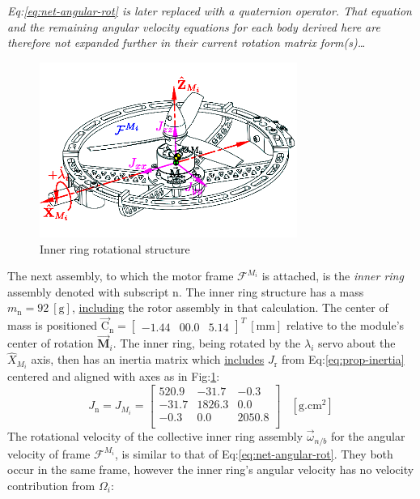\emph{\color{gray} Eq:\ref{eq:net-angular-rot} is later replaced with a quaternion operator. That equation and the remaining angular velocity equations for each body derived here are therefore not expanded further in their current rotation matrix form(s)\ldots}
\par
\begin{figure}[htbp]
\vspace{-12pt}
\centering
\includegraphics[width=0.75\textwidth]{figs/inertia-inner}
\vspace{-10pt}
\caption{Inner ring rotational structure}
\label{fig:inertia-inner}
\end{figure}
The next assembly, to which the motor frame $\mathcal{F}^{M_i}$ is attached, is the \emph{inner ring} assembly denoted with subscript n. The inner ring structure has a mass $m_\text{n}=92~[\text{g}]$, \underline{including} the rotor assembly in that calculation. The center of mass is positioned $\vec{\text{C}}_{\text{n}}=\begin{bmatrix}-1.44&00.0&5.14\end{bmatrix}^T~[\text{mm}]$ relative to the module's center of rotation $\vec{\mathbf{M}}_i$. The inner ring, being rotated by the $\lambda_i$ servo about the $\hat{X}_{M_i}$ axis, then has an inertia matrix which \underline{includes} $J_\text{r}$ from Eq:\ref{eq:prop-inertia} centered and aligned with axes as in Fig:\ref{fig:inertia-inner}:
\begin{equation} \label{eq:inertia.inner}
J_\text{n}=J_{M_i}=\begin{bmatrix}
520.9 & -31.7	& -0.3\\
-31.7 & 1826.3 & 0.0\\
-0.3 & 0.0	& 2050.8\\
\end{bmatrix}~~~~[\text{g.cm}^2]
\end{equation}
The rotational velocity of the collective inner ring assembly $\vec{\omega}_{n/b}$ for the angular velocity of frame $\mathcal{F}^{M_i}$, is similar to that of Eq:\ref{eq:net-angular-rot}. They both occur in the same frame, however the inner ring's angular velocity has no velocity contribution from $\Omega_i$:
